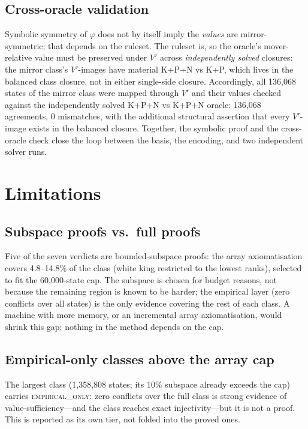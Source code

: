 \documentclass[conference]{IEEEtran}
\begin{document}
\subsection{Cross-oracle validation}
Symbolic symmetry of $\varphi$ does not by itself imply the \emph{values}
are mirror-symmetric; that depends on the ruleset. The ruleset is, so the
oracle's mover-relative value must be preserved under $V'$ across
\emph{independently solved} closures: the mirror class's $V'$-images have
material K+P+N vs K+P, which lives in the balanced class closure, not in
either single-side closure. Accordingly, all 136{,}068 states of the mirror
class were mapped through $V'$ and their values checked against the
independently solved K+P+N vs K+P+N oracle: 136{,}068 agreements, 0
mismatches, with the additional structural assertion that every $V'$-image
exists in the balanced closure. Together, the symbolic proof and the
cross-oracle check close the loop between the basis, the encoding, and two
independent solver runs.

\section{Limitations}
\label{sec:limits}

\subsection{Subspace proofs vs.\ full proofs}
Five of the seven verdicts are bounded-subspace proofs: the array
axiomatisation covers 4.8--14.8\% of the class (white king restricted to
the lowest ranks), selected to fit the 60{,}000-state cap. The subspace is
chosen for budget reasons, not because the remaining region is known to be
harder; the empirical layer (zero conflicts over all states) is the only
evidence covering the rest of each class. A machine with more memory, or an
incremental array axiomatisation, would shrink this gap; nothing in the
method depends on the cap.

\subsection{Empirical-only classes above the array cap}
The largest class (1{,}358{,}808 states; its 10\% subspace already exceeds
the cap) carries \textsc{empirical\_only}: zero conflicts over the full
class is strong evidence of value-sufficiency---and the class reaches exact
injectivity---but it is not a proof. This is reported as its own tier, not
folded into the proved ones.
\end{document}
